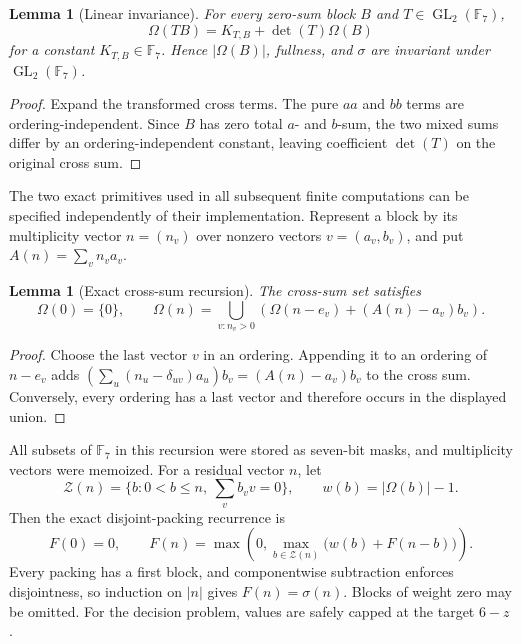 \documentclass[11pt]{amsart}
\newtheorem{lemma}[theorem]{Lemma}
\theoremstyle{definition}
\newcommand{\F}{\mathbb F}
\newcommand{\Om}{\Omega}
\begin{document}
\begin{lemma}[Linear invariance]\label{lem:GL}
For every zero-sum block $B$ and $T\in\operatorname{GL}_2(\F_7)$,
\[
\Om(TB)=K_{T,B}+\det(T)\Om(B)
\]
for a constant $K_{T,B}\in\F_7$. Hence $|\Om(B)|$, fullness, and $\sigma$ are invariant under $\operatorname{GL}_2(\F_7)$.
\end{lemma}

\begin{proof}
Expand the transformed cross terms. The pure $aa$ and $bb$ terms are ordering-independent. Since $B$ has zero total $a$- and $b$-sum, the two mixed sums differ by an ordering-independent constant, leaving coefficient $\det(T)$ on the original cross sum.
\end{proof}

The two exact primitives used in all subsequent finite computations can
be specified independently of their implementation.  Represent a block
by its multiplicity vector $n=(n_v)$ over nonzero vectors
$v=(a_v,b_v)$, and put $A(n)=\sum_v n_v a_v$.

\begin{lemma}[Exact cross-sum recursion]\label{lem:omega-rec}
The cross-sum set satisfies
\[
\Om(0)=\{0\},\qquad
\Om(n)=\bigcup_{v:n_v>0}
 \left(\Om(n-e_v)+(A(n)-a_v)b_v\right).
\]
\end{lemma}

\begin{proof}
Choose the last vector $v$ in an ordering.  Appending it to an ordering
of $n-e_v$ adds
$\left(\sum_u(n_u-\delta_{uv})a_u\right)b_v
=(A(n)-a_v)b_v$ to the cross sum.  Conversely, every ordering has a
last vector and therefore occurs in the displayed union.
\end{proof}

All subsets of $\F_7$ in this recursion were stored as seven-bit masks,
and multiplicity vectors were memoized.  For a residual vector $n$, let
\[
\mathcal Z(n)=\{b:0<b\leq n,\ \textstyle\sum_v b_vv=0\},
\qquad w(b)=|\Om(b)|-1.
\]
Then the exact disjoint-packing recurrence is
\begin{equation}\label{eq:pack-rec}
F(0)=0,\qquad
F(n)=\max\left(0,\max_{b\in\mathcal Z(n)}
                 \bigl(w(b)+F(n-b)\bigr)\right).
\end{equation}
Every packing has a first block, and componentwise subtraction enforces
disjointness, so induction on $|n|$ gives $F(n)=\sigma(n)$.  Blocks of
weight zero may be omitted.  For the decision problem, values are
safely capped at the target $6-z$.
\end{document}
